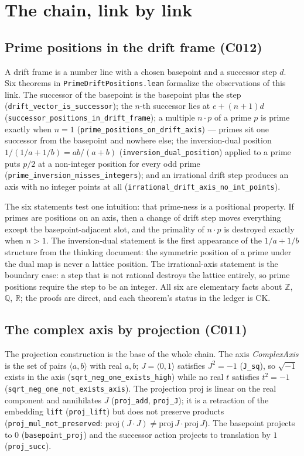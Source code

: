\documentclass[sigplan,10pt,anonymous,review]{acmart}
\begin{document}
\section{The chain, link by link}

\subsection{Prime positions in the drift frame (C012)}

A drift frame is a number line with a chosen basepoint and a successor
step $d$. Six theorems in \texttt{PrimeDriftPositions.lean} formalize the
observations of this link. The successor of the basepoint is the
basepoint plus the step (\texttt{drift\_vector\_is\_successor}); the
$n$-th successor lies at $e + (n+1)d$
(\texttt{successor\_positions\_in\_drift\_frame}); a multiple $n \cdot p$
of a prime $p$ is prime exactly when $n = 1$
(\texttt{prime\_positions\_on\_drift\_axis}) --- primes sit one
successor from the basepoint and nowhere else; the inversion-dual
position $1/(1/a + 1/b) = ab/(a+b)$
(\texttt{inversion\_dual\_position}) applied to a prime puts $p/2$ at a
non-integer position for every odd prime
(\texttt{prime\_inversion\_misses\_integers}); and an irrational drift
step produces an axis with no integer points at all
(\texttt{irrational\_drift\_axis\_no\_int\_points}).

The six statements test one intuition: that prime-ness is a positional
property. If primes are positions on an axis, then a change of drift
step moves everything except the basepoint-adjacent slot, and the
primality of $n \cdot p$ is destroyed exactly when $n > 1$. The
inversion-dual statement is the first appearance of the $1/a + 1/b$
structure from the thinking document: the symmetric position of a prime
under the dual map is never a lattice position. The irrational-axis
statement is the boundary case: a step that is not rational destroys the
lattice entirely, so prime positions require the step to be an integer.
All six are elementary facts about $\mathbb{Z}$, $\mathbb{Q}$,
$\mathbb{R}$; the proofs are direct, and each theorem's status in the
ledger is \textcolor{classical}{CK}.

\subsection{The complex axis by projection (C011)}

The projection construction is the base of the whole chain. The axis
\emph{ComplexAxis} is the set of pairs $\langle a, b\rangle$ with real
$a,b$; $J = \langle 0, 1\rangle$ satisfies $J^2 = -1$
(\texttt{J\_sq}), so $\sqrt{-1}$ exists in the axis
(\texttt{sqrt\_neg\_one\_exists\_high}) while no real $t$ satisfies
$t^2 = -1$ (\texttt{sqrt\_neg\_one\_not\_exists\_axis}). The projection
$\mathrm{proj}$ is linear on the real component and annihilates $J$
(\texttt{proj\_add}, \texttt{proj\_J}); it is a retraction of the
embedding \texttt{lift} (\texttt{proj\_lift}) but does not preserve
products (\texttt{proj\_mul\_not\_preserved}: $\mathrm{proj}(J\cdot J)
\ne \mathrm{proj}\,J \cdot \mathrm{proj}\,J$). The basepoint projects to
$0$ (\texttt{basepoint\_proj}) and the successor action projects to
translation by $1$ (\texttt{proj\_succ}).
\end{document}
